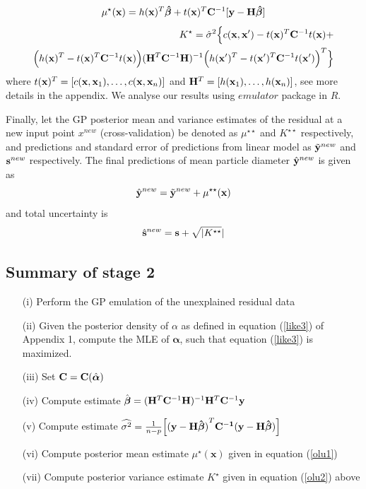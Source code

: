 \documentclass[12pt,titlepage]{report}
\newcommand{\bH}{{\bf H}}
\newcommand{\bC}{{\bf C}}
\newcommand{\bx}{{\bf x}}
\newcommand{\by}{{\bf y}}
\newcommand{\tby}{{\tilde {\bf y}}}
\newcommand{\hby}{{\hat {\bf y}}}
\newcommand{\bs}{{\bf s}}
\newcommand{\hbbeta}{{\hat{\boldsymbol{\beta}}}}
\newcommand{\balpha}{{\boldsymbol{\alpha}}}
\newcommand{\bhalpha}{{\hat{\boldsymbol{\alpha}}}}
\theoremstyle{definition}
\theoremstyle{remark}
\begin{document}
\begin{equation}\label{olu1}%
\mu^{\star}(\mathbf{x})=h(\mathbf{x})^T\boldsymbol{\hat\beta}+t(\mathbf{x})^T\bC^{-1}[\by-\bH\boldsymbol{\hat\beta}]
\end{equation}
\begin{multline}\label{olu2}%
\begin{split}
K^{\star}=\hat \sigma^2 \Big \{c(\mathbf{x,x'}) -t(\mathbf{x})^T\bC^{-1} t(\mathbf{x}) + \\ \Big ( h(\mathbf{x})^T-t(\mathbf{x})^T\bC^{-1}t(\mathbf{x}) \Big )
(\bH^T\bC^{-1}\bH)^{-1}\Big ( h(\mathbf{x'})^T-t(\mathbf{x'})^T\bC^{-1}t(\mathbf{x'}) \Big )^T
\Big \}
\end{split}
\end{multline}
where $t(\bx)^T=[c(\bx,\bx_1),\ldots, c(\bx,\bx_n)]$ and $\bH^T=[h(\bx_1),\ldots, h(\bx_n)]$, see more details in the appendix. We analyse our results using $emulator$ package in $R$.

Finally, let the GP posterior mean and variance estimates of the residual at a new input point $x^{new}$ (cross-validation) be denoted as $\mu^{\star \star}$ and $K^{\star \star}$ respectively, and predictions and standard error of predictions from linear model as $\tby^{new}$ and $\bs^{new}$ respectively. The final predictions of mean particle diameter $\hby^{new}$ is given as
\begin{equation}\label{r1}
\hby^{new} = \tby^{new} +\mu^{\star \star}(\bx)
\end{equation}
and total uncertainty is
\begin{equation}\label{r1}
\hat \bs^{new} = \bs +\sqrt{|K^{\star \star}}|
\end{equation}

\subsection{Summary of stage 2}
\begin{itemize}
\item[{(i)}] Perform the GP emulation of the unexplained residual data 
\item[{(ii)}] Given the posterior density of $\alpha$ as defined in equation (\ref{like3}) of Appendix 1, compute the MLE of $\balpha$, such that equation (\ref{like3}) is maximized.
\item[{(iii)}] Set $\bC= \bC(\bhalpha)$
\item[{(iv)}] Compute estimate $\hbbeta=(\bH^T\bC^{-1}\bH)^{-1}\bH^T\bC^{-1}\by$
\item[{(v)}] Compute estimate $\widehat{\sigma^2}=\frac{1}{n-p}\Big[\mathbf{(y-H\hat{\boldsymbol \beta})}^T\bf C^{-1}(\bf y-H\hat{\boldsymbol \beta})\Big]$
\item[{(vi)}] Compute posterior mean estimate $\mu^{\star}(\mathbf{x})$ given in equation (\ref{olu1})
\item[{(vii)}] Compute posterior variance estimate $K^{\star}$ given in equation (\ref{olu2}) above
\end{itemize}
\end{document}

